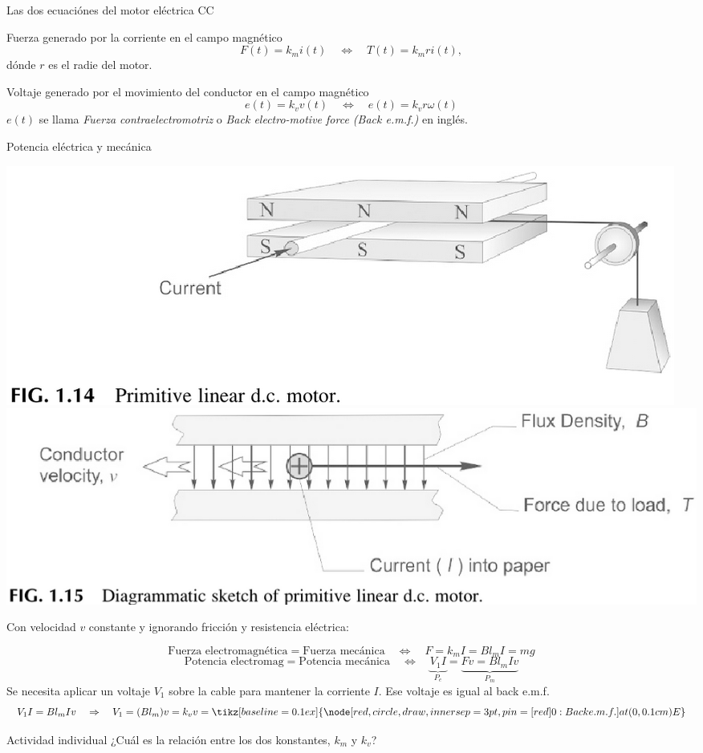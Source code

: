 \documentclass[presentation,aspectratio=169]{beamer}
\begin{document}
\begin{frame}[label={sec:org8b8ec57}]{Las dos ecuaciónes del motor eléctrica CC}
\begin{block}{Fuerza generado por la corriente en el campo magnético}
\[ F(t) = k_m i(t) \quad\Leftrightarrow\quad T(t) = k_m r i(t),\]
dónde \(r\) es el radie del motor.
\end{block}

\begin{block}{Voltaje generado por el movimiento del conductor en el campo magnético}
\[ e(t) = k_v v(t) \quad\Leftrightarrow\quad e(t) = k_v r \omega(t)\]
\(e(t)\) se llama \emph{Fuerza contraelectromotriz} o \emph{Back electro-motive force (Back e.m.f.)} en inglés.
\end{block}
\end{frame}
\begin{frame}[label={sec:org5199a93}]{Potencia eléctrica y mecánica}
\begin{center}
\includegraphics[width=0.4\linewidth]{../../figures/HD-fig1_14.png}
\includegraphics[width=0.53\linewidth]{../../figures/HD-fig1_15.png}
\end{center}

Con velocidad \(v\) constante y ignorando fricción y resistencia eléctrica: 

\[ \text{Fuerza electromagnética} = \text{Fuerza mecánica} \quad\Leftrightarrow\quad F=k_mI =Bl_mI = mg\]
\[ \text{Potencia electromag} = \text{Potencia mecánica} \quad \Leftrightarrow\quad \underbrace{V_1I}_{P_e} = \underbrace{Fv = Bl_mI v}_{P_m} \] 
Se necesita aplicar un voltaje \(V_1\) sobre la cable para mantener la corriente \(I\). \alert{Ese voltaje es igual al back e.m.f.} 
\[ V_1I = Bl_mIv \quad \Rightarrow \quad V_1 = (Bl_m)v = k_v v = \tikz[baseline = 0.1ex]{\node[red, circle, draw, inner sep=3pt, pin={[red]0:{Back e.m.f.}}] at (0, 0.1 cm) {\textcolor{black}{E}}}\]

\alert{Actividad individual} ¿Cuál es la relación entre los dos konstantes, \(k_m\) y \(k_v\)?
\end{frame}
\end{document}
